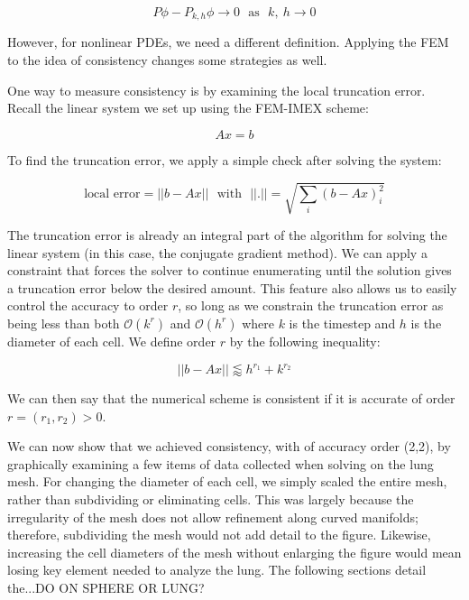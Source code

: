 \documentclass[12pt]{article}
\begin{document}
\begin{equation}
	P\phi - P_{k,h}\phi \rightarrow 0 ~~~\text{as} ~~~ k,~h \rightarrow 0
\end{equation}

However, for nonlinear PDEs, we need a different definition. Applying the FEM to the idea  of consistency changes some strategies as well.

One way to measure consistency is by examining the local truncation error. Recall the linear system we set up using the FEM-IMEX scheme:

\begin{equation}
	Ax=b
\end{equation}

To find the truncation error, we apply a simple check after solving the system:

\begin{equation}
	\text{local error} = ||b-Ax|| ~~~ \text{with} ~~~ ||.|| = \sqrt{\sum_i (b-Ax)_i^2}
\end{equation}

The truncation error is already an integral part of the algorithm for solving the linear system (in this case, the conjugate gradient method). We can apply a constraint that forces the solver to continue enumerating until the solution gives a truncation error below the desired amount. This feature also allows us to easily control the accuracy to order $r$, so long as we constrain the truncation error as being less than both $\mathcal{O}(k^r)$ and $\mathcal{O}(h^r)$ where $k$ is the timestep and $h$ is the diameter of each cell. We define order $r$ by the following inequality:

\begin{equation}
	||b-Ax|| \lessapprox h^{r_1}+k^{r_2}
\end{equation}

We can then say that the numerical scheme is consistent if it is accurate of order $r=(r_1,r_2)>0$.

We can now show that we achieved consistency, with of accuracy order (2,2), by graphically examining a few items of data collected when solving on the lung mesh. For changing the diameter of each cell, we simply scaled the entire mesh, rather than subdividing or eliminating cells. This was largely because the irregularity of the mesh does not allow refinement along curved manifolds; therefore, subdividing the mesh would not add detail to the figure. Likewise, increasing the cell diameters of the mesh without enlarging the figure would mean losing key element needed to analyze the lung. The following sections detail the...DO ON SPHERE OR LUNG?
\end{document}
